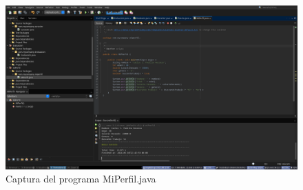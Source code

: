 \documentclass{article}
\begin{document}
\begin{landscape}
    \newpage

    \begin{figure}[h]
        \centering
        \includegraphics[width=\linewidth]{img/miPerfil.png}
        \caption{Captura del programa MiPerfil.java}
        \label{fig:captura}
    \end{figure}
\end{landscape}
\end{document}

